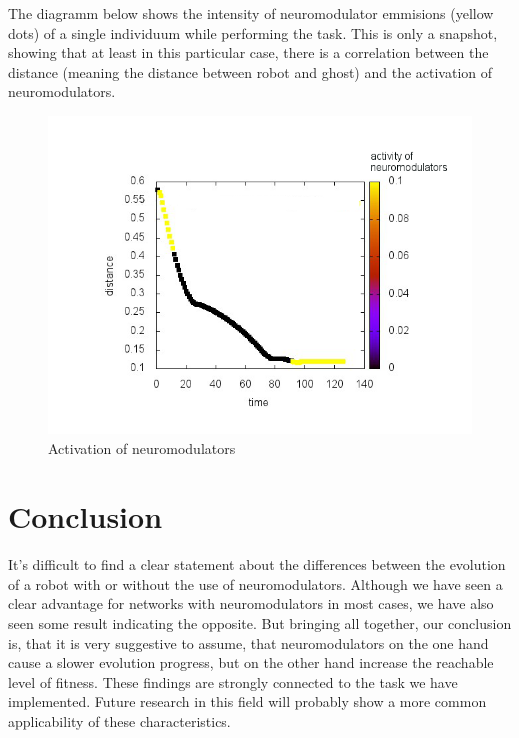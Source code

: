 \documentclass[12pt,fleqn,a4paper]{article}
\begin{document}
\newpage

The diagramm below shows the intensity of neuromodulator emmisions (yellow dots) of a single individuum while performing the task. This is only a snapshot, showing that at least in this particular case, there is a correlation between the distance (meaning the distance between robot and ghost) and the activation of neuromodulators.

\begin{figure}[H]
\centering
\includegraphics[scale=0.5]{img/dose_plot.png}
\caption{Activation of neuromodulators}
\label{fig:diagram4}
\end{figure}


\newpage

\section{Conclusion}
It's difficult to find a clear statement about the differences between the evolution of a robot with or without the use of neuromodulators. Although we have seen a clear advantage for networks with neuromodulators in most cases, we have also seen some result indicating the opposite. But bringing all together, our conclusion is, that it is very suggestive to assume, that neuromodulators on the one hand cause a slower evolution progress, but on the other hand increase the reachable level of fitness. These findings are strongly connected to the task we have implemented. Future research in this field will probably show a more common applicability of these characteristics.
\end{document}
